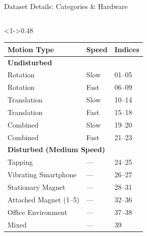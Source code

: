 \documentclass[aspectratio=169,xcolor=dvipsnames]{beamer}
\begin{document}
\begin{frame}{Dataset Details: Categories \& Hardware}
\scriptsize
\begin{columns}[T]
  \begin{column}<1->{0.48\textwidth}
      \begin{tabular}{|p{}|p{}|p{}|}
        \hline
        \textbf{Motion Type} & \textbf{Speed} & \textbf{Indices} \\ \hline
        \multicolumn{3}{|l|}{\textbf{Undisturbed}} \\ \hline
        Rotation    & Slow & 01–05 \\ 
        Rotation    & Fast & 06–09 \\
        Translation & Slow & 10–14 \\
        Translation & Fast & 15–18 \\
        Combined    & Slow & 19–20 \\
        Combined    & Fast & 21–23 \\ \hline
        \multicolumn{3}{|l|}{\textbf{Disturbed (Medium Speed)}} \\ \hline
        Tapping               & — & 24–25 \\
        Vibrating Smartphone  & — & 26–27 \\
        Stationary Magnet     & — & 28–31 \\
        Attached Magnet (1–5) & — & 32–36 \\
        Office Environment    & — & 37–38 \\
        Mixed                 & — & 39     \\ \hline
      \end{tabular}
    
  \end{column}


\end{columns}
\end{frame}
\end{document}
